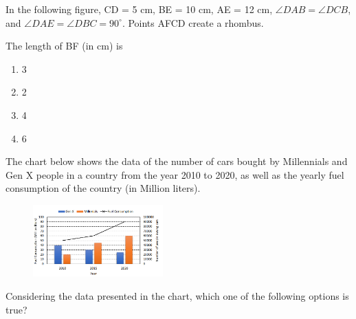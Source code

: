     \item In the following figure, 
    CD = 5 cm, BE = 10 cm, AE = 12 cm, 
    $\angle DAB = \angle DCB$, and $\angle DAE = \angle DBC = 90^\circ$.
    Points AFCD create a rhombus.
    \begin{figure}[!ht]
\centering
{}%

\label{fig:my_label}
\end{figure}
    The length of BF (in cm) is
    \begin{enumerate}
        \item  3
        \item  2
        \item  4
        \item  6
    \end{enumerate}
    \item The chart below shows the data of the number of cars bought by Millennials and Gen X people in a country from the year 2010 to 2020, as well as the yearly fuel consumption of the country (in Million liters).
     \begin{figure}[!ht]
    \centering
    \includegraphics[width=5cm]{./GATE-yearwise/2024/figs/fig1.png}
    \end{figure}
    Considering the data presented in the chart, which one of the following options is true?
    
